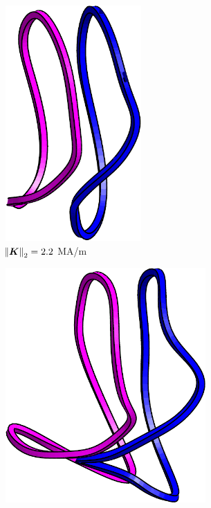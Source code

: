 \documentclass[aps,unsortedaddress]{revtex4-1}
\begin{document}
\FloatBarrier
\begin{figure}
\begin{subfigure}[b]{0.3\textwidth}
\includegraphics[width=0.57\textwidth]{target_2_2e6.pdf}
\caption{$\norm{\bm{K}}_2 = 2.2$ MA/m}
\end{subfigure}
\begin{subfigure}[b]{0.3\textwidth}
\includegraphics[width=0.84\textwidth]{target_2_7e6.pdf}

\end{subfigure}
\end{figure}
\end{document}
